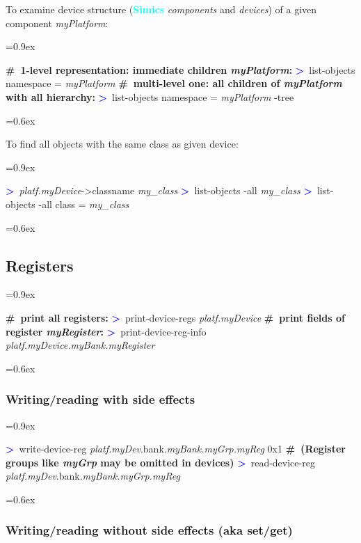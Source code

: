 \documentclass[8pt]{extarticle}
\DeclareRobustCommand{\bseries}{\fontseries{b}\selectfont}
\newenvironment{code}[1][]{%
\begin{prebox}[#1]\obeylines%
\fontdimen2\font=0.9ex%
}{%
\end{prebox}%
\fontdimen2\font=0.6ex%
}
\newcommand{\ind}{\hphantom{~~~}}
\newcommand{\sprompt}{\textcolor{blue}{\textbf{>}\ }}
\newcommand{\cmtcommon}[1]{\textcolor{Sepia}{\textbf{#1}}}
\newcommand{\cmt}[1]{\cmtcommon{\#\ #1}}
\newcommand{\p}[1]{\textit{\large#1}}
\newcommand{\Simics}{\textcolor{cyan}{\textbf{Simics}}}
\begin{document}
\begin{multicols*}{3}
To examine device structure (\Simics{} \textit{components}
and \textit{devices}) of a given component \p{myPlatform}:
\begin{code}
    \cmt{1-level representation: immediate children \p{myPlatform}:}
    \sprompt list-objects namespace = \p{myPlatform}
    \cmt{multi-level one: all children of \p{myPlatform} with all hierarchy:}
    \sprompt list-objects namespace = \p{myPlatform} -tree
\end{code}

To find all objects with the same class as given device:
        \begin{code}
            \sprompt \p{platf.myDevice}->classname
            \p{my_class}
            \sprompt list-objects -all \p{my_class}
            \sprompt list-objects -all class = \p{my_class}
        \end{code}

\subsection{Registers}
\begin{code}
    \cmt{print all registers:}
    \sprompt print-device-regs \p{platf.myDevice}
    \cmt{print fields of register \p{myRegister}:}
    \sprompt print-device-reg-info \p{platf.myDevice.myBank.myRegister}
\end{code}

\subsubsection{Writing/reading with side effects}

\begin{code}
    \sprompt write-device-reg
    \ind \ind \p{platf.myDev}.bank.\p{myBank.myGrp.myReg} 0x1
    \cmt{(Register groups like \p{myGrp} may be omitted in devices)}
    \sprompt read-device-reg \p{platf.myDev}.bank.\p{myBank.myGrp.myReg}
\end{code}

\subsubsection{Writing/reading {\bseries without} side effects (aka set/get)}


\end{multicols*}
\end{document}
